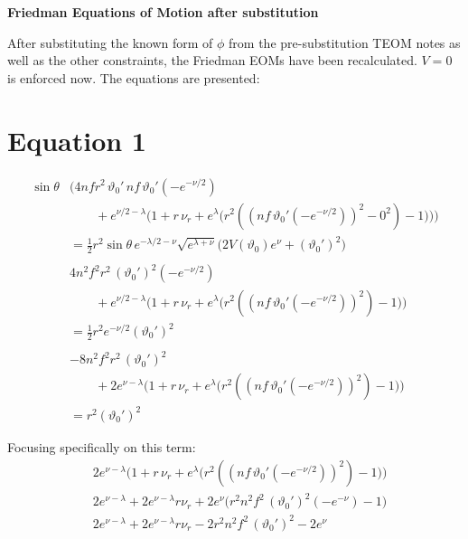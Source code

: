\documentclass[12pt]{article}
\begin{document}
\begin{center}
  \Large\textbf{Friedman Equations of Motion after substitution} \\
  \large{}
\end{center}

After substituting the known form of $\phi$ from the pre-substitution TEOM notes as well as the other constraints, the Friedman EOMs have been recalculated. $V=0$ is enforced now. The equations are presented:

\section*{Equation 1}

\begin{align*}
\sin\theta &\Big(
  4 n f r^2 \, \vartheta_0' 
  \, n f \, \vartheta_0' (- e^{-\nu/2}) \\
  & \qquad + e^{\nu/2 - \lambda} \Big(
      1 + r \, \nu_r + e^{\lambda} \big( r^2 ((n f \, \vartheta_0' (- e^{-\nu/2}))^2 - 0^2) - 1 \big)
    \Big)
\Big) \\
& = \frac{1}{2} r^2 \sin\theta \, e^{-\lambda/2 - \nu} \sqrt{e^{\lambda+\nu}} \Big( 2 V(\vartheta_0) e^{\nu} + (\vartheta_0')^2 \Big)  \\  \\
&4 n^2 f^2 r^2
  \, (\vartheta_0')^2 (- e^{-\nu/2})  \\
  & \qquad + e^{\nu/2 - \lambda} \Big(
      1 + r \, \nu_r + e^{\lambda} \big( r^2 ((n f \, \vartheta_0' (- e^{-\nu/2}))^2) - 1 \big)
    \Big) \\
& = \frac{1}{2} r^2 e^{-\nu/2} (\vartheta_0')^2  \\  \\
&-8 n^2 f^2 r^2
  \, (\vartheta_0')^2 \\
  & \qquad + 2e^{\nu - \lambda} \Big(
      1 + r \, \nu_r + e^{\lambda} \big( r^2 ((n f \, \vartheta_0' (- e^{-\nu/2}))^2) - 1 \big)
    \Big) \\
& = r^2 (\vartheta_0')^2 
\end{align*}

Focusing specifically on this term:
\begin{align*}
  &2e^{\nu - \lambda} \Big(
      1 + r \, \nu_r + e^{\lambda} \big( r^2 ((n f \, \vartheta_0' (- e^{-\nu/2}))^2) - 1 \big)
    \Big) \\
  &2e^{\nu - \lambda} + 2e^{\nu - \lambda}r \nu_r + 2e^{\nu} \big( r^2 n^2 f^2 \, (\vartheta_0')^2 (- e^{-\nu}) - 1 \big) \\
  &2e^{\nu - \lambda} + 2e^{\nu - \lambda}r \nu_r - 2 r^2 n^2 f^2 \, (\vartheta_0')^2 - 2e^{\nu}
\end{align*}
\end{document}
